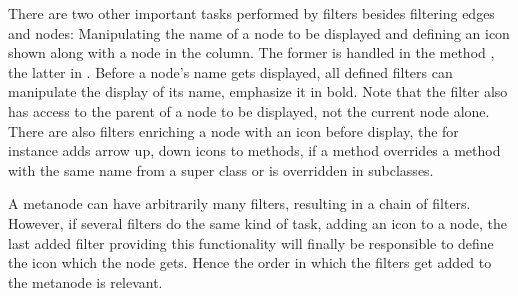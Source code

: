 \documentclass[a4paper,10pt,twoside]{book}
\begin{document}
There are two other important tasks performed by filters besides filtering edges and nodes: Manipulating the name of a node to be displayed and defining an icon shown along with a node in the column. The former is handled in the method , the latter in . Before a node's name gets displayed, all defined filters can manipulate the display of its name, \eg emphasize it in bold. Note that the filter also has access to the parent of a node to be displayed, not the current node alone. There are also filters enriching a node with an icon before display, the  for instance adds arrow up, down icons to methods, if a method overrides a method with the same name from a super class or is overridden in subclasses.

A metanode can have arbitrarily many filters, resulting in a chain of filters. However, if several filters do the same kind of task, \eg adding an icon to a node, the last added filter providing this functionality will finally be responsible to define the icon which the node gets. Hence the order in which the filters get added to the metanode is relevant. 




\end{document}
